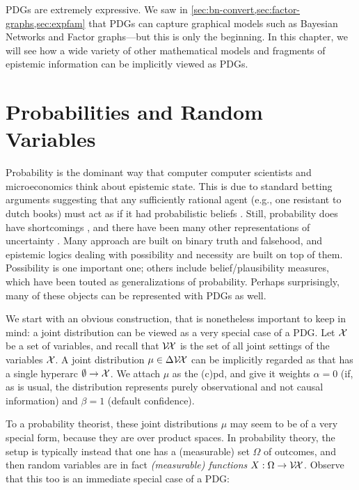 PDGs are extremely expressive.
We saw in \cref{sec:bn-convert,sec:factor-graphs,sec:expfam} that PDGs
can capture graphical models such as Bayesian Networks and Factor graphs---but this is only the beginning. 
%
In this chapter, we will see how a wide variety of other mathematical models and fragments of epistemic information can be implicitly viewed as PDGs.


\section{Probabilities and Random Variables}
    \label{sec:prob-as-pdg}

Probability is the dominant way that computer computer scientists and
microeconomics think about epistemic state.
This is due to standard betting arguments suggesting that any sufficiently rational agent (e.g., one resistant to dutch books)
must act as if it had probabilistic beliefs \cite{..,savage}.
Still, probability does have shortcomings \cite{}, and there have been many other representations of uncertainty \cite{halpern2017reasoning}.
Many approach are built on binary truth and falsehood, and epistemic logics dealing with possibility and necessity are built on top of them.
Possibility is one important one; others include belief/plausibility measures, which have been touted as generalizations of probability. 
Perhaps surprisingly, many of these objects can be represented with PDGs as well.

We start with an obvious construction, that is nonetheless important
to keep in mind: a joint distribution can be viewed as a very special case of a PDG. 
Let $\mathcal X$ be a set of variables, and recall that $\mathcal V\!\mathcal X$ is the set of all joint settings of the variables $\mathcal X$. 
A joint distribution $\mu \in \Delta \mathcal V\!\mathcal X$ can be implicitly regarded as that has a single hyperarc $\emptyset \to \mathcal X$. We attach $\mu$ as the (c)pd, and give it weights $\alpha=0$ (if, as is usual, the distribution represents purely observational and not causal information) and $\beta = 1$ (default confidence). 

To a probability theorist, these joint distributions $\mu$ may seem to be of a very special form, because they are over product spaces. 
In probability theory, the setup is typically instead that one has a (measurable) set $\Omega$ of outcomes, and then random variables are in fact \emph{(measurable) functions} $X : \Omega \to \mathcal V\!\mathcal X$. 
Observe that this too is an immediate special case of a PDG:

